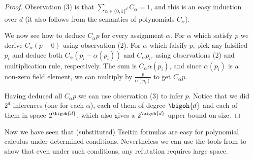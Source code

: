 \documentclass{toc}
\begin{document}
\begin{proof}
Observation (3) is that $\sum_{\alpha\in\{0,1\}^{d}} C_{\alpha} = 1$,
and this is an easy induction over $d$ (it also follows from the
semantics of polynomials $C_\alpha$).

We now see how to deduce $C_{\alpha} p$ for every assignment $\alpha$.
%
For $\alpha$ which satisfy $p$ we derive $C_{\alpha}(p - 0)$ using observation (2).
%
For $\alpha$ which falsify $p$, pick any falsified $p_{i}$ and deduce
both $C_{\alpha} (p_{i}-\alpha(p_{i}))$ and $C_{\alpha}p_{i}$, using
observations (2) and multiplication rule, respectively. The sum is
$C_{\alpha}\alpha(p_{i})$, and since $\alpha(p_{i})$ is a non-zero
field element, we
can multiply by $\frac{p}{\alpha(p_{i})}$ to get $C_{\alpha}p$.
%

Having deduced all $C_{\alpha}p$ we can use observation (3) to infer $p$.
%
Notice that we did $2^{d}$ inferences (one for each $\alpha$), each of them of degree $\bigoh{d}$ and each of them in space $2^{\bigoh{d}}$, which also gives
%
a $2^{\bigoh{d}}$ upper bound %
on size.
\end{proof}

Now we have seen that (substituted) Tseitin formulas are easy for
polynomial calculus under determined conditions. Nevertheless we can
use the tools from  to show that even
under such conditions, any refutation requires large space.
\end{document}

